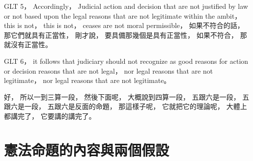 \hypertarget{w02:cue:2559}{}GLT 5，
\hypertarget{w02:cue:2560}{}Accordingly，
\hypertarget{w02:cue:2561}{}Judicial action and decision that are not justified by law or not based upon the legal reasons that are not legitimate within the ambit，
\hypertarget{w02:cue:2562}{}this is not，
\hypertarget{w02:cue:2563}{}this is not，
\hypertarget{w02:cue:2564}{}ceases are not moral permissible，
\hypertarget{w02:cue:2565}{}如果不符合的話，
\hypertarget{w02:cue:2566}{}那它們就具有正當性，
\hypertarget{w02:cue:2567}{}剛才說，
\hypertarget{w02:cue:2568}{}要具備那幾個是具有正當性，
\hypertarget{w02:cue:2569}{}如果不符合，
\hypertarget{w02:cue:2570}{}那就沒有正當性。

\hypertarget{w02:cue:2571}{}GLT 6，
\hypertarget{w02:cue:2572}{}it follows that judiciary should not recognize as good reasons for action or decision reasons that are not legal，
\hypertarget{w02:cue:2573}{}nor legal reasons that are not legitimate，
\hypertarget{w02:cue:2574}{}nor legal reasons that are not legitimate。

\hypertarget{w02:cue:2575}{}好，
\hypertarget{w02:cue:2576}{}所以一到三算一段，
\hypertarget{w02:cue:2577}{}然後下面呢，
\hypertarget{w02:cue:2578}{}大概說到四算一段，
\hypertarget{w02:cue:2579}{}五跟六是一段，
\hypertarget{w02:cue:2580}{}五跟六是一段，
\hypertarget{w02:cue:2581}{}五跟六是反面的命題，
\hypertarget{w02:cue:2582}{}那這樣子呢，
\hypertarget{w02:cue:2583}{}它就把它的理論呢，
\hypertarget{w02:cue:2584}{}大體上都講完了，
\hypertarget{w02:cue:2585}{}它要講的講完了。

\section{憲法命題的內容與兩個假設}

